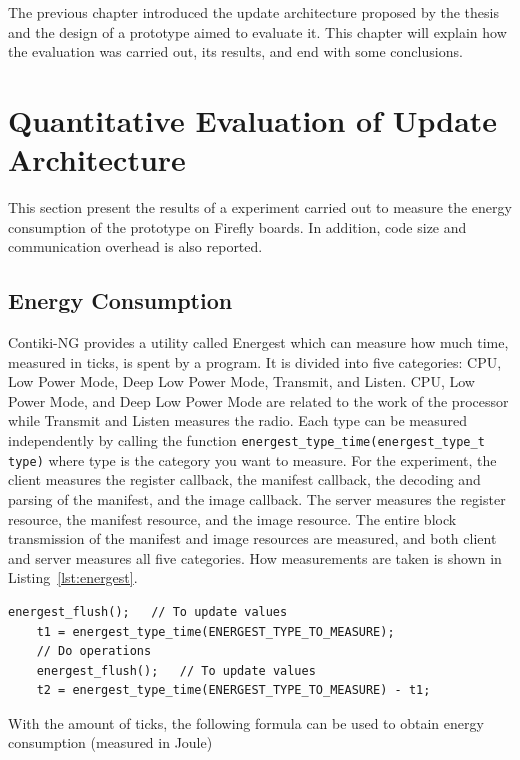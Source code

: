 \documentclass[0-thesis.tex]{subfiles}
\begin{document}
The previous chapter introduced the update architecture proposed by the thesis and the
design of a prototype aimed to evaluate it. This chapter will explain how the evaluation
was carried out, its results, and end with some conclusions.

\section{Quantitative Evaluation of Update Architecture}
\label{sec:quant-evaluation}
This section present the results of a experiment carried out to measure the energy
consumption of the prototype on Firefly boards. In addition, code size and communication
overhead is also reported. 

\subsection{Energy Consumption}
\label{ssec:energy-consumption}
Contiki-NG provides a utility called Energest which can measure how much time, measured in
ticks, is spent by a program. It is divided into five categories: CPU, Low Power Mode,
Deep Low Power Mode, Transmit, and Listen. CPU, Low Power Mode, and Deep Low Power Mode
are related to the work of the processor while Transmit and Listen measures the radio.
Each type can be measured independently by calling the function
\texttt{energest\_type\_time(energest\_type\_t type)} where type is the category you want
to measure. For the experiment, the client measures the register callback, the manifest
callback, the decoding and parsing of the manifest, and the image callback. The server
measures the register resource, the manifest resource, and the image resource. The entire
block transmission of the manifest and image resources are measured, and both client and
server measures all five categories. How measurements are taken is shown in
Listing~\ref{lst:energest}.

\begin{lstlisting}[language=manifest, caption={How to measure ticks in energest.}, label=lst:energest]
    energest_flush();   // To update values
    t1 = energest_type_time(ENERGEST_TYPE_TO_MEASURE);
    // Do operations
    energest_flush();   // To update values
    t2 = energest_type_time(ENERGEST_TYPE_TO_MEASURE) - t1;
\end{lstlisting}

With the amount of ticks, the following formula can be used to obtain energy consumption
(measured in Joule)
\end{document}
